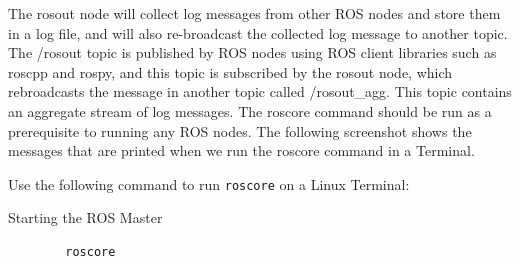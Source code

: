\documentclass[../../main]{subfiles}
\begin{document}
The rosout node will collect log messages from other ROS nodes and store them in a log file, and will also re-broadcast the collected log message to another topic. The /rosout topic is published by ROS nodes using ROS client libraries such as roscpp and rospy, and this topic is subscribed by the rosout node, which rebroadcasts the message in another topic called /rosout\_agg. This topic contains an aggregate stream of log messages. The roscore command should be run as a prerequisite to running any ROS nodes. The following screenshot shows the messages that are printed when we run the roscore command in a Terminal.

Use the following command to run \texttt{roscore} on a Linux Terminal:
\begin{codebox}[]{Starting the ROS Master}    
    \begin{verbatim}
        roscore
    \end{verbatim}
\end{codebox}
\end{document}
